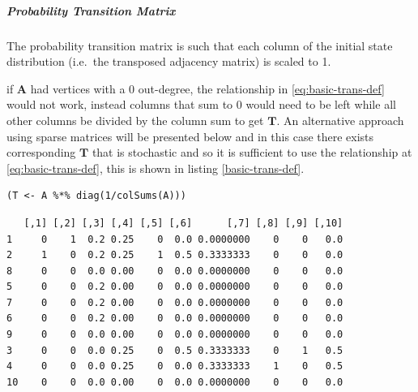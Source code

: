 \documentclass[11pt]{article}
\begin{document}
\subparagraph{Probability Transition Matrix}
\label{probability-transition-matrix}
The probability transition matrix is such that each column of the
initial state distribution (i.e. the transposed adjacency matrix) is
scaled to 1.

if \(\mathbf{A}\) had vertices with a 0 out-degree, the relationship in \eqref{eq:basic-trans-def} would not work, instead columns that sum to 0 would
need to be left while all other columns be divided by the column sum to get
\(\mathbf{T}\). An alternative approach using sparse matrices will be presented
below and in this case there exists corresponding \(\mathbf{T}\) that is
stochastic and so it is sufficient to use the relationship at
\eqref{eq:basic-trans-def}, this is shown in listing \ref{basic-trans-def}.

\begin{lstlisting}
(T <- A %*% diag(1/colSums(A)))

\end{lstlisting}

\begin{verbatim}
   [,1] [,2] [,3] [,4] [,5] [,6]      [,7] [,8] [,9] [,10]
1     0    1  0.2 0.25    0  0.0 0.0000000    0    0   0.0
2     1    0  0.2 0.25    1  0.5 0.3333333    0    0   0.0
8     0    0  0.0 0.00    0  0.0 0.0000000    0    0   0.0
5     0    0  0.2 0.00    0  0.0 0.0000000    0    0   0.0
7     0    0  0.2 0.00    0  0.0 0.0000000    0    0   0.0
6     0    0  0.2 0.00    0  0.0 0.0000000    0    0   0.0
9     0    0  0.0 0.00    0  0.0 0.0000000    0    0   0.0
3     0    0  0.0 0.25    0  0.5 0.3333333    0    1   0.5
4     0    0  0.0 0.25    0  0.0 0.3333333    1    0   0.5
10    0    0  0.0 0.00    0  0.0 0.0000000    0    0   0.0
\end{verbatim}
\end{document}
